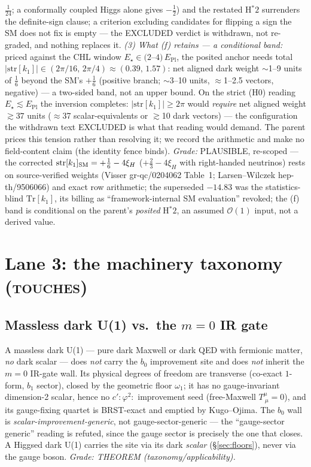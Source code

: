 \documentclass[11pt]{article}
\newcommand{\Epl}{E_{\mathrm{Pl}}}
\newcommand{\str}{\mathrm{str}}
\newcommand{\touch}{{\normalfont\scshape touches}}
\begin{document}
$\tfrac1{24}$; a conformally coupled Higgs alone gives $-\tfrac12$) and the restated
H$^{*}2$ surrenders the definite-sign clause; a criterion excluding candidates for flipping
a sign the SM does not fix is empty --- the EXCLUDED verdict is withdrawn, not re-graded,
and nothing replaces it. \emph{(3) What (f) retains --- a conditional band:} priced against
the CHL window $E_\star\in(2$--$4)\,\Epl$, the posited anchor needs total
$|\str[k_1]|\in(2\pi/16,\,2\pi/4)\approx(0.39,\,1.57)$: net aligned dark weight $\sim$1--9
units of $\tfrac16$ beyond the SM's $+\tfrac16$ (positive branch; $\sim$3--10 units,
$\approx$1--2.5 vectors, negative) --- a two-sided band, not an upper bound. On the strict
(H0) reading $E_\star\lesssim\Epl$ the inversion completes: $|\str[k_1]|\ge2\pi$ would
\emph{require} net aligned weight $\gtrsim37$ units ($\approx$37 scalar-equivalents or
$\gtrsim$10 dark vectors) --- the configuration the withdrawn text EXCLUDED is what that
reading would demand. The parent prices this tension rather than resolving it; we record
the arithmetic and make no field-content claim (the identity fence binds).
\emph{Grade:} PLAUSIBLE, re-scoped --- the corrected
$\str[k_1]_{\rm SM}=+\tfrac16-4\xi_H$ ($+\tfrac23-4\xi_H$ with right-handed neutrinos)
rests on source-verified weights (Visser gr-qc/0204062 Table~1; Larsen--Wilczek
hep-th/9506066) and exact row arithmetic; the superseded $-14.83$ was the statistics-blind
$\mathrm{Tr}[k_1]$, its billing as ``framework-internal SM evaluation'' revoked; the (f)
band is conditional on the parent's \emph{posited} H$^{*}2$, an assumed $\mathcal O(1)$
input, not a derived value.

\section{Lane 3: the machinery taxonomy (\touch)}\label{sec:taxonomy}

\subsection{Massless dark U(1) vs.\ the $m=0$ IR gate}
A massless dark U(1) --- pure dark Maxwell or dark QED with fermionic matter,
\emph{no} dark scalar --- does \emph{not} carry the $b_0$ improvement site and
does \emph{not} inherit the $m=0$ IR-gate wall. Its physical degrees of freedom
are transverse (co-exact $1$-form, $b_1$ sector), closed by the geometric floor
$\omega_1$; it has no gauge-invariant dimension-2 scalar, hence no
$c'\!:\!\varphi^2\!:$ improvement seed (free-Maxwell $T^\mu_{\ \mu}=0$), and its
gauge-fixing quartet is BRST-exact and emptied by Kugo--Ojima. The $b_0$ wall is
\emph{scalar-improvement-generic}, not gauge-sector-generic --- the ``gauge-sector
generic'' reading is refuted, since the gauge sector is precisely the one that
closes. A Higgsed dark U(1) carries the site via its dark \emph{scalar}
(\S\ref{sec:floors}), never via the gauge boson.
\emph{Grade: THEOREM (taxonomy/applicability).}
\end{document}
